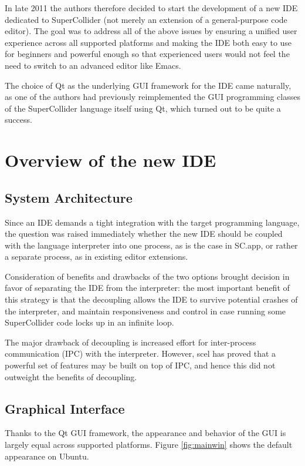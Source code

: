 \documentclass[11pt,a4paper]{article}
\begin{document}
In late 2011 the authors therefore decided to start the development of a new IDE dedicated to SuperCollider (not
merely an extension of a general-purpose code editor). The goal was to address all of the above issues by ensuring a
unified user experience across all supported platforms and making the IDE both easy to use for beginners and powerful
enough so that experienced users would not feel the need to switch to an advanced editor like Emacs.

The choice of Qt as the underlying GUI framework for the IDE came naturally, as one of the authors had previously
reimplemented the GUI programming classes of the SuperCollider language itself using Qt, which turned out to be quite a
success.

\section{Overview of the new IDE}

\subsection{System Architecture}

Since an IDE demands a tight integration with the target programming language, the question was
raised immediately whether the new IDE should be coupled with the language interpreter into one
process, as is the case in SC.app, or rather a separate process, as in existing editor extensions.

Consideration of benefits and drawbacks of the two options brought decision in favor of
separating the IDE from the interpreter: the most important benefit of this strategy is that the
decoupling allows the IDE to survive potential crashes of the interpreter, and maintain
responsiveness and control in case running some SuperCollider code locks up in an infinite loop.

The major drawback of decoupling is increased effort for inter-process communication (IPC) with the
interpreter. However, scel has proved that a powerful set of features may be built on top of IPC,
and hence this did not outweight the benefits of decoupling.

\subsection{Graphical Interface}
\label{gui}

Thanks to the Qt GUI framework, the appearance and behavior of the GUI is largely equal across supported platforms.
Figure \ref{fig:mainwin} shows the default appearance on Ubuntu.
\end{document}
